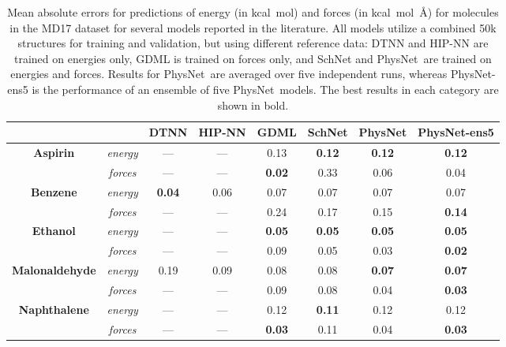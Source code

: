 \documentclass[12pt]{article}
\newcommand{\nn}{PhysNet}
\begin{document}
\begin{table}[htbp]
\captionsetup{width=0.9\textwidth}
\caption{Mean absolute errors for predictions of energy (in
  kcal~mol) and forces (in kcal~mol~\AA) for
  molecules in the MD17 dataset for several models reported in the
  literature. All models utilize a combined 50k structures for
  training and validation, but using different reference data: DTNN
  and HIP-NN are trained on energies
  only,\cite{schutt2017quantum,lubbers2018hierarchical} GDML is
  trained on forces only,\cite{chmiela2018towards} and SchNet and
  \nn\ are trained on energies and forces.\cite{schutt2017schnet}
  Results for \nn\ are averaged over five independent runs, whereas
  \nn-ens5 is the performance of an ensemble\cite{breiman1996bagging}
  of five \nn\ models. The best results in each category are shown in
  bold.}
\label{tab:md17_results}
	
\centering
\begin{tabular}{c c c c c c c c}
\toprule
	& & 
\textbf{DTNN}\cite{schutt2017quantum} &
\textbf{HIP-NN}\cite{lubbers2018hierarchical}  &
\textbf{GDML}\cite{chmiela2017machine} &
\textbf{SchNet}\cite{schutt2017schnet} &
\textbf{\nn} &
\textbf{\nn-ens5}\\
\midrule

\multirow{ 2}{*}{\bf Aspirin} & \textit{energy} &  --- & --- & 0.13  & \bf 0.12 & \bf 0.12 & \bf 0.12\\
\addlinespace[1pt]
& \textit{forces} & --- & --- & \bf 0.02 & 0.33 & 0.06 & 0.04\\
\midrule

\multirow{ 2}{*}{\bf Benzene} &\textit{energy} & \bf 0.04 & 0.06 & 0.07   & 0.07 &  0.07 & 0.07 \\
\addlinespace[1pt]
& \textit{forces} & --- & --- & 0.24 & 0.17 & 0.15 & \bf 0.14 \\
\midrule

\multirow{ 2}{*}{\bf Ethanol} &\textit{energy} & --- & --- & \bf 0.05 & \bf 0.05 & \bf 0.05 & \bf 0.05\\
\addlinespace[1pt]
& \textit{forces} & --- & --- & 0.09 &0.05 & 0.03 & \bf 0.02\\
\midrule

\multirow{ 2}{*}{\bf Malonaldehyde} & \textit{energy} & 0.19 & 0.09 & 0.08 & 0.08 & \bf 0.07 & \bf 0.07\\
\addlinespace[1pt]
& \textit{forces} & --- & --- & 0.09 & 0.08 & 0.04 & \bf 0.03\\
\midrule

\multirow{ 2}{*}{\bf Naphthalene} & \textit{energy} & --- & --- & 0.12 & \bf 0.11 & 0.12 & 0.12\\
\addlinespace[1pt]
& \textit{forces} & --- & --- & \bf 0.03 & 0.11 & 0.04 & \bf 0.03\\
\midrule


\end{tabular}
\end{table}
\end{document}
